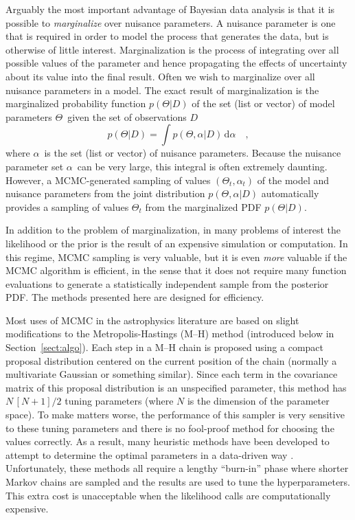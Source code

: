 \documentclass[12pt,preprint]{aastex}
\newcommand{\eqlabel}[1]{\label{eq:#1}}
\newcommand{\Sect}[1]{Section~\ref{sect:#1}}
\newcommand{\sect}[1]{\Sect{#1}}
\newcommand{\dd}{\mathrm{d}}
\renewcommand{\vector}[1]{#1}
\newcommand{\pr}[1]{\ensuremath{p(#1)}}
\newcommand{\model}{\ensuremath{\vector{\Theta}}}
\newcommand{\data}{\ensuremath{\vector{D}}}
\newcommand{\nuisance}{\ensuremath{\vector{\alpha}}}
\begin{document}
Arguably the most important advantage of Bayesian data analysis is
that it is possible to \emph{marginalize} over nuisance parameters. A
nuisance parameter is one that is required in order to model the
process that generates the data, but is otherwise of little interest.
Marginalization is the process of integrating over all possible values of
the  parameter and hence propagating the effects of uncertainty about
its value into the final result.  Often we wish to marginalize over all
nuisance parameters in a model.  The exact result of marginalization
is the marginalized probability function \pr{\model | \data}
of the set (list or vector) of model parameters
\model\ given the set of observations \data
\begin{equation}
    \eqlabel{marginalization}
    \pr{\model | \data} = \int
        \pr{ \model, \nuisance | \data} \,
        \dd  \nuisance \quad,
\end{equation}
where \nuisance\ is the set (list or vector) of nuisance
parameters. Because the nuisance parameter set \nuisance\ can be very large, this
integral is often extremely daunting.  However, a
MCMC-generated sampling of values $(\model_t,\nuisance_t)$ of the
model and nuisance parameters from the joint distribution $\pr{\model,
  \nuisance | \data}$ automatically provides a sampling of values
$\model_t$ from the marginalized PDF $\pr{\model | \data}$.

In addition to the problem of marginalization, in many problems of
interest the likelihood or the prior is the result of an expensive
simulation or computation. In this regime, MCMC sampling is very
valuable, but it is even \emph{more} valuable if the MCMC algorithm is
efficient, in the sense that it does not require many function
evaluations to generate a statistically independent sample from the
posterior PDF.  The methods presented here are designed for efficiency.

Most uses of MCMC in the astrophysics literature are based on slight
modifications to the Metropolis-Hastings (M--H) method (introduced
below in \sect{algo}).  Each step in a M--H chain is proposed using a
compact proposal distribution centered on the current position of the
chain (normally a multivariate Gaussian or something similar). Since
each term in the covariance matrix of this proposal distribution is an
unspecified parameter, this method has $N\,[N+1]/2$ tuning parameters
(where $N$ is the dimension of the parameter space).  To make matters
worse, the performance of this sampler is very sensitive to these
tuning parameters and there is no fool-proof method for choosing the
values correctly. As a result, many heuristic methods have been
developed to attempt to determine the optimal parameters in a
data-driven way \citep[for
  example,][]{Gregory:2005,Dunkley:2005,Widrow:2008}. Unfortunately,
these methods all require a lengthy ``burn-in'' phase where shorter
Markov chains are sampled and the results are used to tune the
hyperparameters. This extra cost is unacceptable when the likelihood
calls are computationally expensive.
\end{document}
